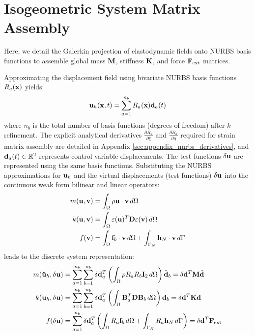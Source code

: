 \section{Isogeometric System Matrix Assembly}

Here, we detail the Galerkin projection of elastodynamic fields onto NURBS basis functions to assemble global mass $\mathbf{M}$, stiffness $\mathbf{K}$, and force $\mathbf{F}_{\text{ext}}$ matrices.

Approximating the displacement field using bivariate NURBS basis functions $R_a(\mathbf{x})$ yields:
\begin{equation}
    \mathbf{u}_h(\mathbf{x}, t) = \sum_{a=1}^{n_b} R_a(\mathbf{x}) \mathbf{d}_a(t)
\end{equation}
where $n_b$ is the total number of basis functions (degrees of freedom) after $k$-refinement. The explicit analytical derivatives $\frac{\partial R_a}{\partial \xi}$ and $\frac{\partial R_a}{\partial \eta}$ required for strain matrix assembly are detailed in Appendix \ref{sec:appendix_nurbs_derivatives}, and $\mathbf{d}_a(t) \in \mathbb{R}^2$ represents control variable displacements. The test functions $\delta \mathbf{u}$ are represented using the same basis functions. Substituting the NURBS approximations for $\mathbf{u}_h$ and the virtual displacements (test functions) $\delta\mathbf{u}$ into the continuous weak form bilinear and linear operators:
\begin{align}
    m(\mathbf{u}, \mathbf{v}) & = \int_{\Omega} \rho \mathbf{u} \cdot \mathbf{v} \, d\Omega                                             \\
    k(\mathbf{u}, \mathbf{v}) & = \int_{\Omega} \mathbf{\varepsilon}(\mathbf{u})^T \mathbf{D} \mathbf{\varepsilon}(\mathbf{v}) \, d\Omega   \\
    f(\mathbf{v})           & = \int_{\Omega} \mathbf{f}_b \cdot \mathbf{v} \, d\Omega + \int_{\Gamma_N} \mathbf{h}_N \cdot \mathbf{v} \, d\Gamma
\end{align}
leads to the discrete system representation:
\begin{align}
    m(\ddot{\mathbf{u}}_h, \delta\mathbf{u}) & = \sum_{a=1}^{n_b} \sum_{b=1}^{n_b} \delta\mathbf{d}_a^T \left( \int_{\Omega} \rho R_a R_b \mathbf{I}_2 \, d\Omega \right) \ddot{\mathbf{d}}_b = \delta \mathbf{d}^T \mathbf{M} \ddot{\mathbf{d}} \\
    k(\mathbf{u}_h, \delta\mathbf{u})        & = \sum_{a=1}^{n_b} \sum_{b=1}^{n_b} \delta\mathbf{d}_a^T \left( \int_{\Omega} \mathbf{B}_a^T \mathbf{D} \mathbf{B}_b \, d\Omega \right) \mathbf{d}_b = \delta \mathbf{d}^T \mathbf{K} \mathbf{d}      \\
    f(\delta\mathbf{u})                    & = \sum_{a=1}^{n_b} \delta\mathbf{d}_a^T \left( \int_{\Omega} R_a \mathbf{f}_b \, d\Omega + \int_{\Gamma_N} R_a \mathbf{h}_N \, d\Gamma \right) = \delta \mathbf{d}^T \mathbf{F}_{\text{ext}}
\end{align}

